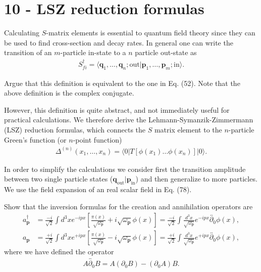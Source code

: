\documentclass[working, oneside]{../../Preambles/tuftebook}
\begin{document}
\let\cleardoublepage\clearpage
\thispagestyle{fancy}
\chapter{10 - LSZ reduction formulas}

Calculating $S$-matrix elements is essential to quantum field theory since they can be used to find cross-section and decay rates. In general one can write the transition of an $m$-particle in-state to a $n$ particle out-state as
\begin{align*}
S_{fi}^\dagger = \langle \mathbf{q}_1, \dots, \mathbf{q}_n; \text{out} | \mathbf{p}_1, \dots, \mathbf{p}_m; \text{in} \rangle. \tag{87}
\end{align*}

\begin{exercise}[1]
Argue that this definition is equivalent to the one in Eq. (52). Note that the above definition is the complex conjugate.
\end{exercise}

However, this definition is quite abstract, and not immediately useful for practical calculations. We therefore derive the Lehmann-Symanzik-Zimmermann (LSZ) reduction formulas, which connects the $S$ matrix element to the $n$-particle Green's function (or $n$-point function)
\begin{align*}
\Delta^{(n)}(x_1, \dots, x_n) = \langle 0 | T \left[ \phi(x_1) \dots \phi(x_n) \right] | 0 \rangle. \tag{88}
\end{align*}

In order to simplify the calculations we consider first the transition amplitude between two single particle states ($\mathbf{q}_{\text{out}} | \mathbf{p}_{\text{in}}$) and then generalize to more particles. We use the field expansion of an real scalar field in Eq. (78).

\begin{exercise}[2]
Show that the inversion formulas for the creation and annihilation operators are
\begin{align*}
a_\mathbf{p}^\dagger &= \frac{-i}{\sqrt{2}} \int d^3x e^{-ipx} \left[ \frac{\pi(x)}{\sqrt{\omega_\mathbf{p}}} + i \sqrt{\omega_\mathbf{p}} \phi(x) \right] = \frac{-i}{\sqrt{2}} \int \frac{d^3x}{\sqrt{\omega_\mathbf{p}}} e^{-ipx} \overleftrightarrow{\partial_0} \phi(x), \tag{89a} \\
a_\mathbf{p} &= \frac{+i}{\sqrt{2}} \int d^3x e^{+ipx} \left[ \frac{\pi(x)}{\sqrt{\omega_\mathbf{p}}} - i \sqrt{\omega_\mathbf{p}} \phi(x) \right] = \frac{+i}{\sqrt{2}} \int \frac{d^3x}{\sqrt{\omega_\mathbf{p}}} e^{+ipx} \overleftrightarrow{\partial_0} \phi(x), \tag{89b}
\end{align*}
where we have defined the operator
\begin{align*}
A \overleftrightarrow{\partial_0} B = A (\partial_0 B) - (\partial_0 A) B. \tag{90}
\end{align*}
\end{exercise}
\end{document}
